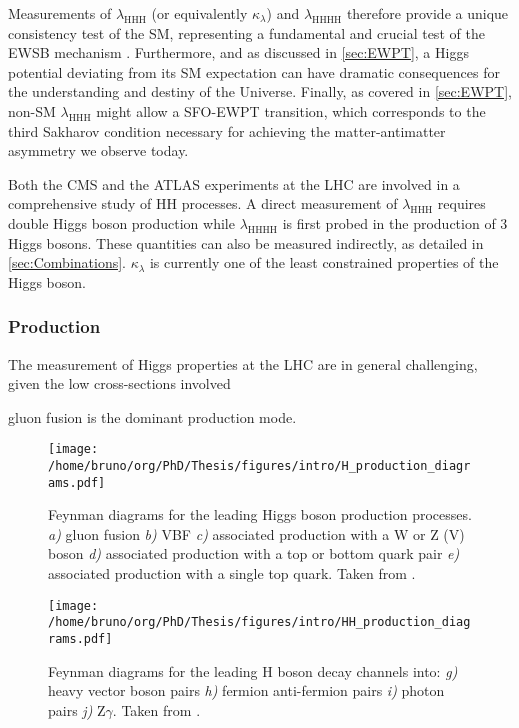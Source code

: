 \documentclass[11pt]{article}
\newcommand{\klfour}{\lambda_{\text{HHHH}}}
\newcommand{\klthree}{\lambda_{\text{HHH}}}
\newcommand{\kl}{\kappa_{\lambda}}
\begin{document}
Measurements of \(\klthree\) (or equivalently \(\kl\)) and \(\klfour\) therefore provide a unique consistency test of the \ac{SM}, representing a fundamental and crucial test of the \ac{EWSB} mechanism \cite{deFlorian:2227475}.
Furthermore, and as discussed in \cref{sec:EWPT}, a Higgs potential deviating from its SM expectation can have dramatic consequences for the understanding and destiny of the Universe.
Finally, as covered in \cref{sec:EWPT}, non-SM \(\klthree\) might allow a \ac{SFO-EWPT} transition, which corresponds to the third Sakharov condition necessary for achieving the matter-antimatter asymmetry we observe today.

Both the \ac{CMS} and the \ac{ATLAS} experiments at the \ac{LHC} are involved in a comprehensive study of HH processes.
A direct measurement of \(\klthree\) requires double Higgs boson production while \(\klfour\) is first probed in the production of 3 Higgs bosons.
These quantities can also be measured indirectly, as detailed in \cref{sec:Combinations}.
\(\kl\) is currently one of the least constrained properties of the Higgs boson.

\subsubsection{Production}
\label{sec:org5710b2b}
\label{sec:production}

The measurement of Higgs properties at the LHC are in general challenging, given the low cross-sections involved

gluon fusion is the dominant production mode.

\begin{figure}[htbp]
\centering
\texttt{[image: /home/bruno/org/PhD/Thesis/figures/intro/H\_production\_diagrams.pdf]}
\caption{\label{fig:H_production_diagrams}Feynman diagrams for the leading Higgs boson production processes. \emph{a)} gluon fusion \emph{b)} \ac{VBF} \emph{c)} associated production with a W or Z (V) boson \emph{d)} associated production with a top or bottom quark pair \emph{e)} associated production with a single top quark. Taken from \cite{higgs_10_years}.}
\end{figure}

\begin{figure}[htbp]
\centering
\texttt{[image: /home/bruno/org/PhD/Thesis/figures/intro/HH\_production\_diagrams.pdf]}
\caption{\label{fig:HH_production_diagrams}Feynman diagrams for the leading H boson decay channels into: \emph{g)} heavy vector boson pairs \emph{h)} fermion anti-fermion pairs \emph{i)} photon pairs \emph{j)} Z\(\gamma\). Taken from \cite{higgs_10_years}.}
\end{figure}
\end{document}
